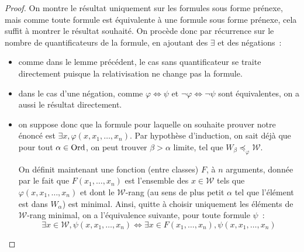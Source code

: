 \begin{proof}
  On montre le résultat uniquement sur les formules sous forme prénexe, mais
  comme toute formule est équivalente à une formule sous forme prénexe, cela
  suffit à montrer le résultat souhaité. On procède donc par récurrence sur
  le nombre de quantificateurs de la formule, en ajoutant des $\exists$ et des
  négations~:
  \begin{itemize}
  \item comme dans le lemme précédent, le cas sans quantificateur se traite
    directement puisque la relativisation ne change pas la formule.
  \item dans le cas d'une négation, comme $\varphi \iff \psi$ et
    $\lnot\varphi\iff\lnot\psi$ sont équivalentes, on a aussi le résultat
    directement.
  \item on suppose donc que la formule pour laquelle on souhaite prouver notre
    énoncé est $\exists x, \varphi(x,x_1,\ldots,x_n)$. Par hypothèse
    d'induction, on sait déjà que pour tout $\alpha \in \operatorname{Ord}$, on peut trouver
    $\beta > \alpha$ limite, tel que
    $W_\beta \preccurlyeq_{\varphi} \mathcal W$.

    On définit maintenant une fonction (entre classes) $F$, à $n$ arguments,
    donnée par le fait que $F(x_1,\ldots,x_n)$ est l'ensemble des
    $x \in \mathcal W$ tels que $\varphi(x,x_1,\ldots,x_n)$ et dont le
    $\mathcal W$-rang (au sens de plus petit $\alpha$ tel que l'élément est dans
    $W_\alpha$) est minimal. Ainsi, quitte à choisir uniquement les éléments de
    $\mathcal W$-rang minimal, on a l'équivalence suivante, pour toute formule
    $\psi$~:
    \[\exists x \in \mathcal W, \psi(x,x_1,\ldots,x_n) \iff
    \exists x \in F(x_1,\ldots,x_n), \psi(x,x_1,\ldots,x_n)\]


\end{itemize}
\end{proof}
